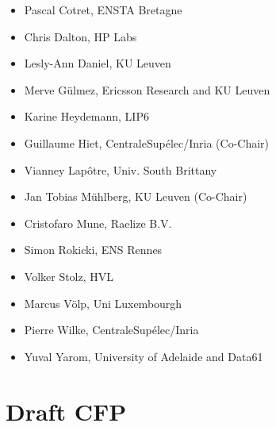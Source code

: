\documentclass[a4paper,11pt]{article}
\begin{document}

\begin{itemize}
    \item Pascal Cotret, ENSTA Bretagne
    \item Chris Dalton, HP Labs
    \item{Lesly-Ann Daniel, KU Leuven}
    \item{Merve G\"ulmez, Ericsson Research and KU Leuven}
    \item Karine Heydemann, LIP6
    \item Guillaume Hiet, CentraleSupélec/Inria (Co-Chair)
    \item Vianney Lap\^otre, Univ. South Brittany
    \item Jan Tobias M\"uhlberg, KU Leuven (Co-Chair)
    \item Cristofaro Mune, Raelize B.V.
    \item Simon Rokicki, ENS Rennes
    \item Volker Stolz, HVL
    \item{Marcus V\"olp, Uni Luxembourgh}
    \item Pierre Wilke, CentraleSup\'elec/Inria
    \item Yuval Yarom, University of Adelaide and Data61
\end{itemize}


\section{Draft CFP}
%

\end{document}
